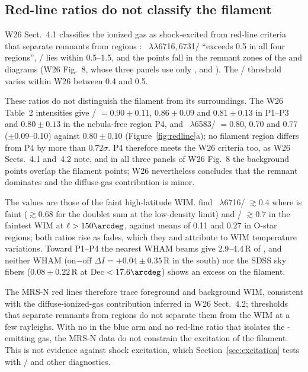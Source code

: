 \subsection{Red-line ratios do not classify the \texorpdfstring{\Oiii{}}{[O III]} filament}\label{sec:shock}

W26 Sect.~4.1 classifies the ionized gas as shock-excited from red-line criteria that separate remnants from  regions \citep{Fesen1985}: \Sii~$\lambda\lambda$6716,\,6731/\Ha{} ``exceeds 0.5 in all four regions'', \Nii/\Ha{} lies within 0.5--1.5, and the points fall in the remnant zones of the \citet{Sabin2013} and \citet{Kopsacheili2020} diagrams (W26 Fig.~8, whose three panels use only \Ha, \Nii{} and \Sii). The \Sii/\Ha{} threshold varies within W26 between 0.4 and 0.5.

These ratios do not distinguish the filament from its surroundings. The W26 Table~2 intensities give \Sii/\Ha{} $=0.90\pm0.11$, $0.86\pm0.09$ and $0.81\pm0.13$ in P1--P3 and $0.80\pm0.13$ in the nebula-free region P4, and \Nii~$\lambda$6583/\Ha{} $=0.80$, 0.70 and 0.77 ($\pm0.09$--0.10) against $0.80\pm0.10$ (Figure~\ref{fig:redline}a); no filament region differs from P4 by more than $0.72\sigma$. P4 therefore meets the W26 criteria too, as W26 Sects.~4.1 and~4.2 note, and in all three panels of W26 Fig.~8 the background points overlap the filament points; W26 nevertheless concludes that the remnant dominates and the diffuse-gas contribution is minor.

The values are those of the faint high-latitude WIM. \citet{Madsen2006} find \Sii~$\lambda$6716/\Ha{} $\gtrsim0.4$ where \Ha{} is faint ($\gtrsim0.68$ for the doublet sum at the low-density limit) and \Nii/\Ha{} $\gtrsim0.7$ in the faintest WIM at $\ell>150\arcdeg$, against means of 0.11 and 0.27 in O-star  regions; both ratios rise as \Ha{} fades, which they and \citet{Haffner1999} attribute to WIM temperature variations. Toward P1--P4 the nearest WHAM beams \citep{Haffner2003} give 2.9--4.4\,R of \Ha, and neither WHAM (on$-$off $\Delta I=+0.04\pm0.35$\,R in the south) nor the SDSS sky fibers ($0.08\pm0.22$\,R at Dec $<17.6\arcdeg$) shows an excess on the filament.

The MRS-N red lines therefore trace foreground and background WIM, consistent with the diffuse-ionized-gas contribution inferred in W26 Sect.~4.2; thresholds that separate remnants from  regions do not separate them from the WIM at a few rayleighs. With no \Hb{} in the blue arm and no red-line ratio that isolates the \Oiii-emitting gas, the MRS-N data do not constrain the excitation of the filament. This is not evidence against shock excitation, which Section~\ref{sec:excitation} tests with \Oiii/\Hb{} and other diagnostics.

